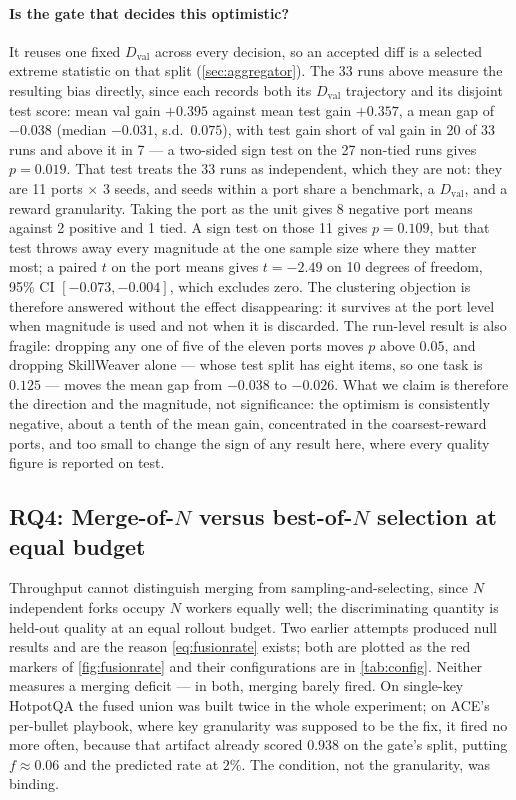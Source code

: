 \documentclass{article}
\newcommand{\Dval}{D_{\mathrm{val}}}
\begin{document}
\paragraph{Is the gate that decides this optimistic?} It reuses one fixed $\Dval$ across every decision, so an accepted diff is a selected extreme statistic on that split (\cref{sec:aggregator}). The 33 runs above measure the resulting bias directly, since each records both its $\Dval$ trajectory and its disjoint test score: mean val gain $+0.395$ against mean test gain $+0.357$, a mean gap of $-0.038$ (median $-0.031$, s.d.\ $0.075$), with test gain short of val gain in 20 of 33 runs and above it in 7 --- a two-sided sign test on the 27 non-tied runs gives $p = 0.019$. That test treats the 33 runs as independent, which they are not: they are 11 ports $\times$ 3 seeds, and seeds within a port share a benchmark, a $\Dval$, and a reward granularity. Taking the port as the unit gives 8 negative port means against 2 positive and 1 tied. A sign test on those 11 gives $p = 0.109$, but that test throws away every magnitude at the one sample size where they matter most; a paired $t$ on the port means gives $t = -2.49$ on 10 degrees of freedom, 95\% CI $[-0.073, -0.004]$, which excludes zero. The clustering objection is therefore answered without the effect disappearing: it survives at the port level when magnitude is used and not when it is discarded. The run-level result is also fragile: dropping any one of five of the eleven ports moves $p$ above $0.05$, and dropping SkillWeaver alone --- whose test split has eight items, so one task is $0.125$ --- moves the mean gap from $-0.038$ to $-0.026$. What we claim is therefore the direction and the magnitude, not significance: the optimism is consistently negative, about a tenth of the mean gain, concentrated in the coarsest-reward ports, and too small to change the sign of any result here, where every quality figure is reported on test.

\subsection{RQ4: Merge-of-$N$ versus best-of-$N$ selection at equal budget}
\label{sec:merge-vs-fork}
Throughput cannot distinguish merging from sampling-and-selecting, since $N$ independent forks occupy $N$ workers equally well; the discriminating quantity is held-out quality at an equal rollout budget. Two earlier attempts produced null results and are the reason \cref{eq:fusionrate} exists; both are plotted as the red markers of \cref{fig:fusionrate} and their configurations are in \cref{tab:config}. Neither measures a merging deficit --- in both, merging barely fired. On single-key HotpotQA the fused union was built twice in the whole experiment; on ACE's per-bullet playbook, where key granularity was supposed to be the fix, it fired no more often, because that artifact already scored $0.938$ on the gate's split, putting $f \approx 0.06$ and the predicted rate at $2\%$. The condition, not the granularity, was binding.
\end{document}
